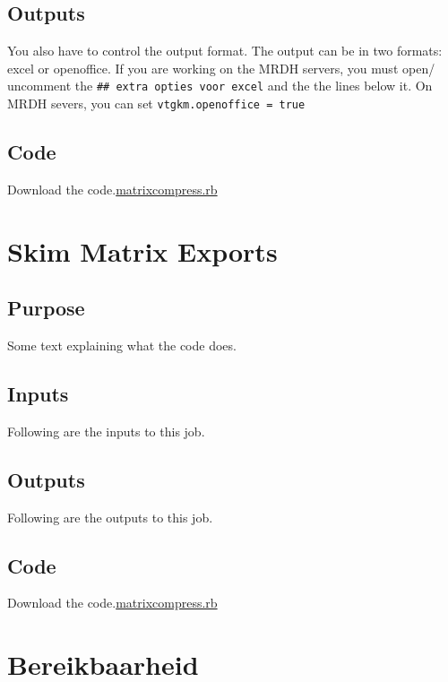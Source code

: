\documentclass[
  letterpaper,
  DIV=11,
  numbers=noendperiod]{scrreprt}
\begin{document}
\section{Outputs}\label{outputs-1}

You also have to control the output format. The output can be in two
formats: excel or openoffice. If you are working on the MRDH servers,
you must open/ uncomment the \texttt{\#\#\ extra\ opties\ voor\ excel}
and the the lines below it. On MRDH severs, you can set
\texttt{vtgkm.openoffice\ =\ true}

\section{Code}\label{code-1}

Download the code.\href{../first.rb}{matrixcompress.rb}

\chapter{Skim Matrix Exports}\label{skim-matrix-exports}

\section{Purpose}

Some text explaining what the code does.

\section{Inputs}

Following are the inputs to this job.

\section{Outputs}

Following are the outputs to this job.

\section{Code}

Download the code.\href{../first.rb}{matrixcompress.rb}

\chapter{Bereikbaarheid}\label{bereikbaarheid}
\end{document}

